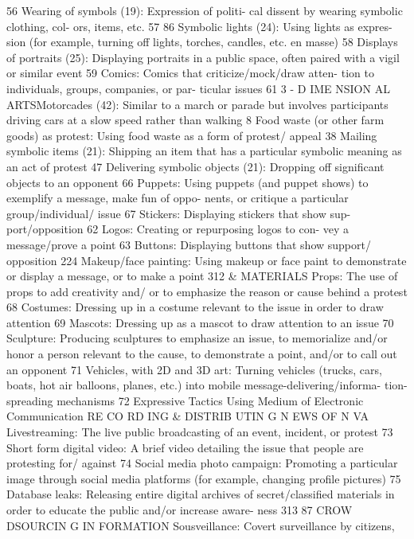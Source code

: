\documentclass[twoside,a4paper,12pt,fleqn,openany]{extbook}
\begin{document}
 56
Wearing of symbols (19): Expression of politi-
cal dissent by wearing symbolic clothing, col-
ors, items, etc.
 57
86
Symbolic lights (24): Using lights as expres-
sion (for example, turning off lights, torches,
candles, etc. en masse)
 58
Displays of portraits (25): Displaying portraits
in a public space, often paired with a vigil or
similar event
 59
Comics: Comics that criticize/mock/draw atten-
tion to individuals, groups, companies, or par-
ticular issues
 61
3 - D IME NSION AL ARTSMotorcades (42): Similar to a march or parade
but involves participants driving cars at a slow
speed rather than walking
 8
Food waste (or other farm goods) as protest:
Using food waste as a form of protest/
appeal
 38
Mailing symbolic items (21): Shipping an item
that has a particular symbolic meaning as an
act of protest
 47
Delivering symbolic objects (21): Dropping off
significant objects to an opponent
 66
Puppets: Using puppets (and puppet shows)
to exemplify a message, make fun of oppo-
nents, or critique a particular group/individual/
issue
 67
Stickers: Displaying stickers that show sup-
port/opposition
 62
Logos: Creating or repurposing logos to con-
vey a message/prove a point
 63
Buttons: Displaying buttons that show support/
opposition
 224
Makeup/face painting: Using makeup or face
paint to demonstrate or display a message, or
to make a point
 312
& MATERIALS
Props: The use of props to add creativity and/
or to emphasize the reason or cause behind a
protest
 68
Costumes: Dressing up in a costume relevant
to the issue in order to draw attention
 69
Mascots: Dressing up as a mascot to draw
attention to an issue
 70
Sculpture: Producing sculptures to emphasize
an issue, to memorialize and/or honor a person
relevant to the cause, to demonstrate a point,
and/or to call out an opponent
 71
Vehicles, with 2D and 3D art: Turning vehicles
(trucks, cars, boats, hot air balloons, planes,
etc.) into mobile message-delivering/informa-
tion-spreading mechanisms
 72
Expressive Tactics Using Medium of Electronic Communication
RE CO RD ING & DISTRIB UTIN G N EWS OF N VA
Livestreaming: The live public broadcasting of
an event, incident, or protest
 73
Short form digital video: A brief video detailing
the issue that people are protesting for/
against
 74
Social media photo campaign: Promoting a
particular image through social media platforms
(for example, changing profile pictures)
 75
Database leaks: Releasing entire digital
archives of secret/classified materials in order
to educate the public and/or increase aware-
ness
 313
87
CROW DSOURCIN G IN FORMATION
Sousveillance: Covert surveillance by citizens,
\end{document}
